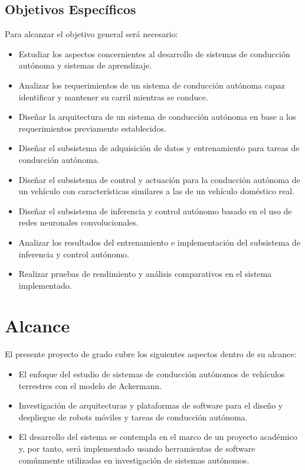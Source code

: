 \subsection{Objetivos Específicos}
Para alcanzar el objetivo general será necesario:


\begin{itemize}

    \item Estudiar los aspectos concernientes al desarrollo de sistemas de conducción autónoma y sistemas de aprendizaje.
    \item Analizar los requerimientos de un sistema de conducción autónoma capaz identificar y mantener su carril mientras se conduce.
    \item Diseñar la arquitectura de un sistema de conducción autónoma en base a los requerimientos previamente establecidos.
    \item Diseñar el subsistema de adquisición de datos y entrenamiento para tareas de conducción autónoma.
    \item Diseñar el subsistema de control y actuación para la conducción autónoma de un vehículo con características similares a las de un vehículo doméstico real.
    \item Diseñar el subsistema de inferencia y control autónomo basado en el uso de redes neuronales convolucionales.
    \item Analizar los resultados del entrenamiento e implementación del subsistema de inferencia y control autónomo.
    \item Realizar pruebas de rendimiento y análisis comparativos en el sistema implementado.

\end{itemize}


\section{Alcance}

El presente proyecto de grado cubre los siguientes aspectos dentro de su alcance:

\begin{itemize}
    \item El enfoque del estudio de sistemas de conducción autónomos de vehículos terrestres con el modelo de Ackermann.
    \item Investigación de arquitecturas y plataformas de software para el
    diseño y despliegue de robots móviles y tareas de conducción autónoma.
    \item El desarrollo del sistema se contempla en el marco de un proyecto académico 
    y, por tanto, será implementado usando herramientas de software comúnmente utilizadas en 
    investigación de sistemas autónomos.
\end{itemize}

